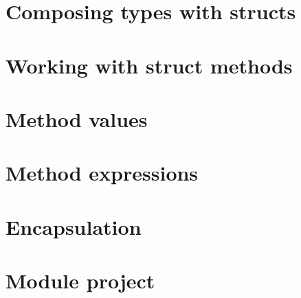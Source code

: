 \documentclass[]{book}
\begin{document}
\hypertarget{composing-types-with-structs}{%
\section{Composing types with structs}\label{composing-types-with-structs}}

\hypertarget{working-with-struct-methods}{%
\section{Working with struct methods}\label{working-with-struct-methods}}

\hypertarget{method-values}{%
\section{Method values}\label{method-values}}

\hypertarget{method-expressions}{%
\section{Method expressions}\label{method-expressions}}

\hypertarget{encapsulation}{%
\section{Encapsulation}\label{encapsulation}}

\hypertarget{module-project-3}{%
\section*{Module project}\label{module-project-3}}
\end{document}
